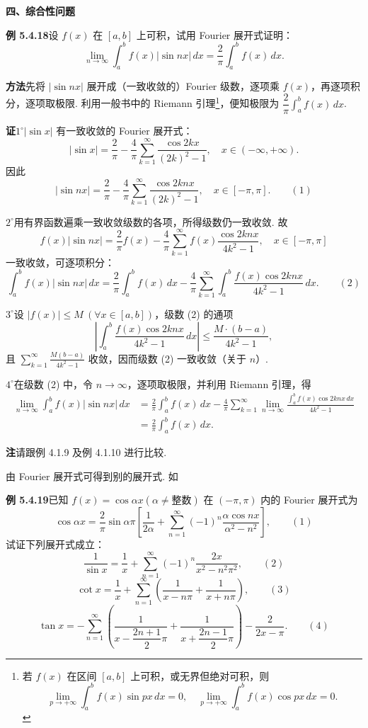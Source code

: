 \documentclass[UTF8,12pt,a4paper,fontset=fandol]{ctexart}
\begin{document}
\noindent\textbf{四、综合性问题}

\noindent\textbf{例 5.4.18}\quad 设 $f(x)$ 在 $[a,b]$ 上可积，试用 Fourier 展开式证明：
\[
  \lim_{n\to\infty}\int_a^b f(x)|\sin nx|\,dx
  =\frac2\pi\int_a^b f(x)\,dx.
\]

\noindent\textbf{方法}\quad 先将 $|\sin nx|$ 展开成（一致收敛的）Fourier 级数，逐项乘 $f(x)$，再逐项积分，逐项取极限. 利用一般书中的 Riemann 引理\footnote{若 $f(x)$ 在区间 $[a,b]$ 上可积，或无界但绝对可积，则
\[
  \lim_{p\to+\infty}\int_a^b f(x)\sin px\,dx=0,\quad
  \lim_{p\to+\infty}\int_a^b f(x)\cos px\,dx=0.
\]
}，便知极限为 $\dfrac2\pi\displaystyle\int_a^b f(x)\,dx$.

\noindent\textbf{证}\quad $1^\circ$\quad $|\sin x|$ 有一致收敛的 Fourier 展开式：
\[
  |\sin x|=\frac2\pi-\frac4\pi\sum_{k=1}^{\infty}\frac{\cos 2kx}{(2k)^2-1},\quad x\in(-\infty,+\infty).
\]
因此
\[
  |\sin nx|=\frac2\pi-\frac4\pi\sum_{k=1}^{\infty}\frac{\cos 2knx}{(2k)^2-1},\quad x\in[-\pi,\pi]. \qquad(1)
\]

$2^\circ$\quad 用有界函数遍乘一致收敛级数的各项，所得级数仍一致收敛. 故
\[
  f(x)|\sin nx|
  =\frac2\pi f(x)-\frac4\pi\sum_{k=1}^{\infty}f(x)\frac{\cos 2knx}{4k^2-1},\quad x\in[-\pi,\pi]
\]
一致收敛，可逐项积分：
\[
  \int_a^b f(x)|\sin nx|\,dx
  =\frac2\pi\int_a^b f(x)\,dx
  -\frac4\pi\sum_{k=1}^{\infty}\int_a^b\frac{f(x)\cos 2knx}{4k^2-1}\,dx. \qquad(2)
\]

$3^\circ$\quad 设 $|f(x)|\le M\ (\forall x\in[a,b])$，级数 (2) 的通项
\[
  \left|\int_a^b\frac{f(x)\cos 2knx}{4k^2-1}\,dx\right|
  \le\frac{M\cdot(b-a)}{4k^2-1},
\]
且 $\displaystyle\sum_{k=1}^{\infty}\frac{M(b-a)}{4k^2-1}$ 收敛，因而级数 (2) 一致收敛（关于 $n$）.

$4^\circ$\quad 在级数 (2) 中，令 $n\to\infty$，逐项取极限，并利用 Riemann 引理，得
\[
\begin{aligned}
\lim_{n\to\infty}\int_a^b f(x)|\sin nx|\,dx
&=\frac2\pi\int_a^b f(x)\,dx
-\frac4\pi\sum_{k=1}^{\infty}\lim_{n\to\infty}
\frac{\displaystyle\int_a^b f(x)\cos 2knx\,dx}{4k^2-1}\\
&=\frac2\pi\int_a^b f(x)\,dx.
\end{aligned}
\]

\noindent\textbf{注}\quad 请跟例 4.1.9 及例 4.1.10 进行比较.

由 Fourier 展开式可得到别的展开式. 如

\noindent\textbf{例 5.4.19}\quad 已知 $f(x)=\cos\alpha x(\alpha\ne\text{整数})$ 在 $(-\pi,\pi)$ 内的 Fourier 展开式为
\[
  \cos\alpha x=\frac2\pi\sin\alpha\pi
  \left[\frac1{2\alpha}+\sum_{n=1}^{\infty}(-1)^n\frac{\alpha\cos nx}{\alpha^2-n^2}\right], \qquad(1)
\]
试证下列展开式成立：
\[
  \frac1{\sin x}=\frac1x+\sum_{n=1}^{\infty}(-1)^n\frac{2x}{x^2-n^2\pi^2}, \qquad(2)
\]
\[
  \cot x=\frac1x+\sum_{n=1}^{\infty}\left(\frac1{x-n\pi}+\frac1{x+n\pi}\right), \qquad(3)
\]
\[
  \tan x=-\sum_{n=1}^{\infty}\left(\frac1{x-\dfrac{2n+1}{2}\pi}
  +\frac1{x+\dfrac{2n-1}{2}\pi}\right)-\frac2{2x-\pi}. \qquad(4)
\]
\end{document}
